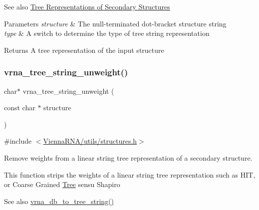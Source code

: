 \begin{DoxySeeAlso}{See also}
\hyperlink{rna_structure_notations_sec_structure_representations_tree}{Tree Representations of Secondary Structures}
\end{DoxySeeAlso}

\begin{DoxyParams}{Parameters}
{\em structure} & The null-\/terminated dot-\/bracket structure string \\
\hline
{\em type} & A switch to determine the type of tree string representation \\
\hline
\end{DoxyParams}
\begin{DoxyReturn}{Returns}
A tree representation of the input {\ttfamily structure} 
\end{DoxyReturn}
\mbox{\label{group__struct__utils__tree_gaa31da26a3f582ddc35a84ff1b9c0a2b0}} 
\subsubsection{\texorpdfstring{vrna\+\_\+tree\+\_\+string\+\_\+unweight()}{vrna\_tree\_string\_unweight()}}
{\footnotesize\ttfamily char$\ast$ vrna\+\_\+tree\+\_\+string\+\_\+unweight (\begin{DoxyParamCaption}\item[{const char $\ast$}]{structure }\end{DoxyParamCaption})}



{\ttfamily \#include $<$\hyperlink{utils_2structures_8h}{Vienna\+R\+N\+A/utils/structures.\+h}$>$}



Remove weights from a linear string tree representation of a secondary structure. 

This function strips the weights of a linear string tree representation such as {\ttfamily H\+IT}, or Coarse Grained \hyperlink{structTree}{Tree} sensu Shapiro \cite{shapiro:1988}

\begin{DoxySeeAlso}{See also}
\hyperlink{group__struct__utils__tree_ga56551ab7da64933a7230d29430f40cfe}{vrna\+\_\+db\+\_\+to\+\_\+tree\+\_\+string()}
\end{DoxySeeAlso}

